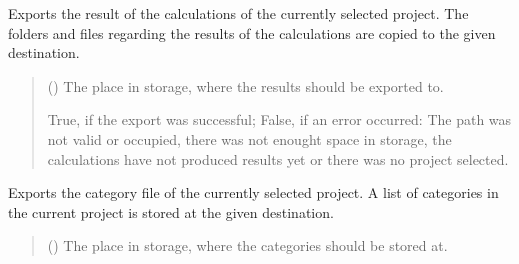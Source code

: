 \documentclass[letterpaper,10pt,english]{sphinxmanual}
\begin{document}
\begin{fulllineitems}
\begin{fulllineitems}
\label{\detokenize{apidoc/src.osm_configurator.control:src.osm_configurator.control.control_interface.IControl.export_calculations}}
\pysigstartsignatures
{}
\pysigstopsignatures
\sphinxAtStartPar
Exports the result of the calculations of the currently selected project.
The folders and files regarding the results of the calculations are copied to the given destination.
\begin{quote}\begin{description}
\sphinxAtStartPar
{} () \textendash{} The place in storage, where the results should be exported to.

\sphinxAtStartPar
True, if the export was successful; False, if an error occurred: The path was not valid or occupied, there was not enought space in storage, the calculations have not produced results yet or there was no project selected.

\sphinxAtStartPar
{}

\end{description}\end{quote}

\end{fulllineitems}


\begin{fulllineitems}
\label{\detokenize{apidoc/src.osm_configurator.control:src.osm_configurator.control.control_interface.IControl.export_configurations}}
\pysigstartsignatures
{}
\pysigstopsignatures
\sphinxAtStartPar
Exports the category file of the currently selected project.
A list of categories in the current project is stored at the given destination.
\begin{quote}\begin{description}
\sphinxAtStartPar
{} () \textendash{} The place in storage, where the categories should be stored at.


\end{description}
\end{quote}
\end{fulllineitems}
\end{fulllineitems}
\end{document}
